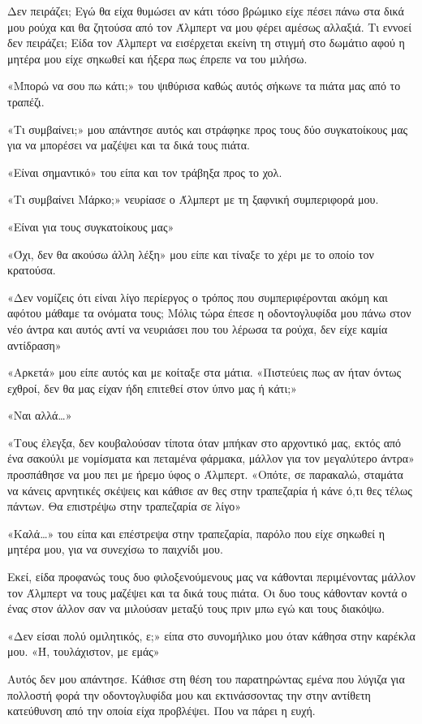 \documentclass[12pt,twoside, openany]{book}
\begin{document}
Δεν πειράζει; Εγώ θα είχα θυμώσει αν κάτι τόσο βρώμικο είχε πέσει πάνω στα δικά μου ρούχα και θα ζητούσα από τον Άλμπερτ να μου φέρει αμέσως αλλαξιά. Τι εννοεί δεν πειράζει; Είδα τον Άλμπερτ να εισέρχεται εκείνη τη στιγμή στο δωμάτιο αφού η μητέρα μου είχε σηκωθεί και ήξερα πως έπρεπε να του μιλήσω. 

«Μπορώ να σου πω κάτι;» του ψιθύρισα καθώς αυτός σήκωνε τα πιάτα μας από το τραπέζι.

«Τι συμβαίνει;» μου απάντησε αυτός και στράφηκε προς τους δύο συγκατοίκους μας για να μπορέσει να μαζέψει και τα δικά τους πιάτα.

«Είναι σημαντικό» του είπα και τον τράβηξα προς το χολ.

«Τι συμβαίνει Μάρκο;» νευρίασε ο Άλμπερτ με τη ξαφνική συμπεριφορά μου.

«Είναι για τους συγκατοίκους μας»

«Όχι, δεν θα ακούσω άλλη λέξη» μου είπε και τίναξε το χέρι με το οποίο τον κρατούσα.

«Δεν νομίζεις ότι είναι λίγο περίεργος ο τρόπος που συμπεριφέρονται ακόμη και αφότου μάθαμε τα ονόματα τους; Μόλις τώρα έπεσε η οδοντογλυφίδα μου πάνω στον νέο άντρα και αυτός αντί να νευριάσει που του λέρωσα τα ρούχα, δεν είχε καμία αντίδραση»

«Αρκετά» μου είπε αυτός και με κοίταξε στα μάτια. «Πιστεύεις πως αν ήταν όντως εχθροί, δεν θα μας είχαν ήδη επιτεθεί στον ύπνο μας ή κάτι;»

«Ναι αλλά…»

«Τους έλεγξα, δεν κουβαλούσαν τίποτα όταν μπήκαν στο αρχοντικό μας, εκτός από ένα σακούλι με νομίσματα και πεταμένα φάρμακα, μάλλον για τον μεγαλύτερο άντρα» προσπάθησε να μου πει με ήρεμο ύφος ο Άλμπερτ. «Οπότε, σε παρακαλώ, σταμάτα να κάνεις αρνητικές σκέψεις και κάθισε αν θες στην τραπεζαρία ή κάνε ό,τι θες τέλως πάντων. Θα επιστρέψω στην τραπεζαρία σε λίγο» 

«Καλά…» του είπα και επέστρεψα στην τραπεζαρία, παρόλο που είχε σηκωθεί η μητέρα μου, για να συνεχίσω το παιχνίδι μου.

Εκεί, είδα προφανώς τους δυο φιλοξενούμενους μας να κάθονται περιμένοντας μάλλον τον Άλμπερτ να τους μαζέψει και τα δικά τους πιάτα. Οι δυο τους κάθονταν κοντά ο ένας στον άλλον σαν να μιλούσαν μεταξύ τους πριν μπω εγώ και τους διακόψω.

«Δεν είσαι πολύ ομιλητικός, ε;» είπα στο συνομήλικο μου όταν κάθησα στην καρέκλα μου. «Ή, τουλάχιστον, με εμάς»

Αυτός δεν μου απάντησε. Κάθισε στη θέση του παρατηρώντας εμένα που λύγιζα για πολλοστή φορά την οδοντογλυφίδα μου και εκτινάσσοντας την στην αντίθετη κατεύθυνση από την οποία είχα προβλέψει. Που να πάρει η ευχή.
\end{document}
